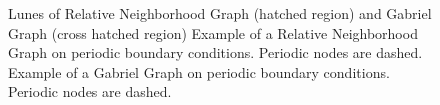    \begin{figure}[htbp]
        \centering
        \caption[Gabriel - and Relative Neighborhood Graph]
        {
             Lunes of Relative Neighborhood
                Graph (hatched region) and
                Gabriel Graph (cross hatched region)
             Example of a Relative
                Neighborhood Graph on periodic boundary conditions.
                Periodic nodes are dashed.
             Example of a Gabriel Graph on
                periodic boundary conditions. Periodic nodes are
                dashed.
        }
        \label{fig:lunes}

    \end{figure}

